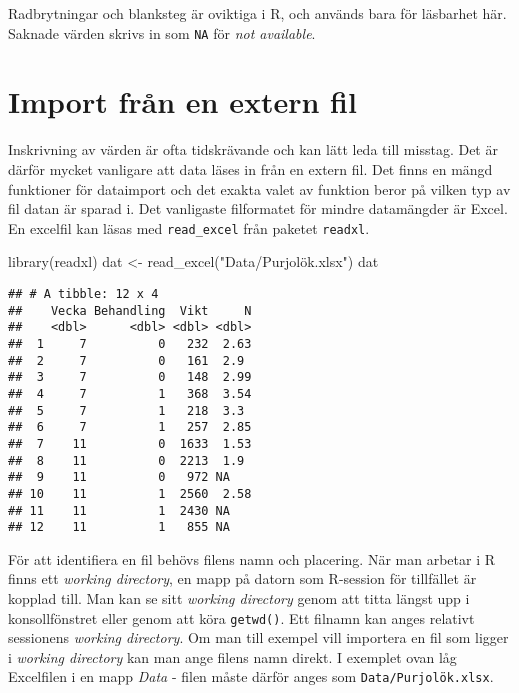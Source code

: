 \documentclass[
]{book}
\newenvironment{Shaded}{\begin{snugshade}}{\end{snugshade}}
\newcommand{\FunctionTok}[1]{\textcolor[rgb]{0.00,0.00,0.00}{#1}}
\newcommand{\NormalTok}[1]{#1}
\newcommand{\OtherTok}[1]{\textcolor[rgb]{0.56,0.35,0.01}{#1}}
\newcommand{\StringTok}[1]{\textcolor[rgb]{0.31,0.60,0.02}{#1}}
\theoremstyle{definition}
\theoremstyle{definition}
\theoremstyle{definition}
\theoremstyle{definition}
\theoremstyle{remark}
\begin{document}
Radbrytningar och blanksteg är oviktiga i R, och används bara för läsbarhet här. Saknade värden skrivs in som \texttt{NA} för \emph{not available}.

\hypertarget{import-fruxe5n-en-extern-fil}{%
\section{Import från en extern fil}\label{import-fruxe5n-en-extern-fil}}

Inskrivning av värden är ofta tidskrävande och kan lätt leda till misstag. Det är därför mycket vanligare att data läses in från en extern fil. Det finns en mängd funktioner för dataimport och det exakta valet av funktion beror på vilken typ av fil datan är sparad i. Det vanligaste filformatet för mindre datamängder är Excel. En excelfil kan läsas med \texttt{read\_excel} från paketet \texttt{readxl}.

\begin{Shaded}
\begin{Highlighting}[]
\FunctionTok{library}\NormalTok{(readxl)}
\NormalTok{dat }\OtherTok{\textless{}{-}} \FunctionTok{read\_excel}\NormalTok{(}\StringTok{"Data/Purjolök.xlsx"}\NormalTok{)}
\NormalTok{dat}
\end{Highlighting}
\end{Shaded}

\begin{verbatim}
## # A tibble: 12 x 4
##    Vecka Behandling  Vikt     N
##    <dbl>      <dbl> <dbl> <dbl>
##  1     7          0   232  2.63
##  2     7          0   161  2.9 
##  3     7          0   148  2.99
##  4     7          1   368  3.54
##  5     7          1   218  3.3 
##  6     7          1   257  2.85
##  7    11          0  1633  1.53
##  8    11          0  2213  1.9 
##  9    11          0   972 NA   
## 10    11          1  2560  2.58
## 11    11          1  2430 NA   
## 12    11          1   855 NA
\end{verbatim}

För att identifiera en fil behövs filens namn och placering. När man arbetar i R finns ett \emph{working directory}, en mapp på datorn som R-session för tillfället är kopplad till. Man kan se sitt \emph{working directory} genom att titta längst upp i konsollfönstret eller genom att köra \texttt{getwd()}. Ett filnamn kan anges relativt sessionens \emph{working directory}. Om man till exempel vill importera en fil som ligger i \emph{working directory} kan man ange filens namn direkt. I exemplet ovan låg Excelfilen i en mapp \emph{Data} - filen måste därför anges som \texttt{Data/Purjolök.xlsx}.
\end{document}

